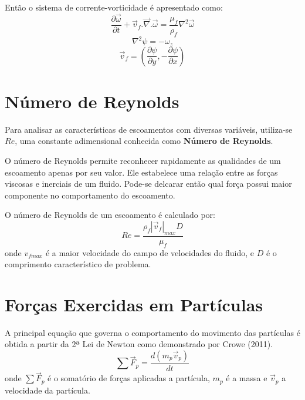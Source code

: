 Então o sistema de corrente-vorticidade é apresentado como:
\begin{equation}
	\dfrac{\partial \vec{\omega}}{\partial t} +
	\vec{v}_f.\vec{\nabla}.\vec{\omega} =
    \dfrac{\mu_f}{\rho_f} \nabla^2 \vec{\omega}
    \label{fluid_eq1}
\end{equation}
\begin{equation}
	\nabla^2\psi =
	-\omega_z
    \label{fluid_eq2}
\end{equation}
\begin{equation}
	\vec{v}_f = \left(\dfrac{\partial \psi}{\partial y},
	-\dfrac{\partial \psi}{\partial x} \right)
    \label{fluid_eq3}
\end{equation}


\section{\textbf{Número de Reynolds}}
\label{sec_reynolds}
Para analisar as características de escoamentos com diversas variáveis, utiliza-se $Re$, uma constante adimensional conhecida como \textbf{Número de Reynolds}.

O número de Reynolds permite reconhecer rapidamente as qualidades de um escoamento apenas por seu valor.
Ele estabelece uma relação entre as forças viscosas e inerciais de um fluido.
Pode-se delcarar então qual força possui maior componente no comportamento do escoamento.

O número de Reynolds de um escoamento é calculado por:
\begin{equation}
    Re = \dfrac{\rho_f |\vec{v}_{f}|_{max} D}{\mu_f} 
    \label{reynolds}
\end{equation}
onde $v_{fmax}$ é a maior velocidade do campo de velocidades do fluido, e $D$ é o comprimento característico de problema.


\section{\textbf{Forças Exercidas em Partículas}}
\label{sec_eq_part}
A principal equação que governa o comportamento do movimento das partículas é obtida a partir da 2ª Lei de Newton como demonstrado por Crowe (2011)\cite{crowe}.
\begin{equation}
    \sum\vec{F}_{p} = \dfrac{d(m_p\vec{v}_p)}{dt}
    \label{newton} 
\end{equation}
onde $\sum\vec{F}_{p}$ é o somatório de forças aplicadas a partícula, $m_p$ é a massa e $\vec{v}_p$ a velocidade da partícula.

